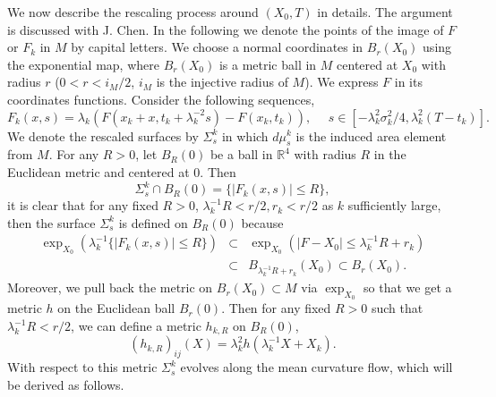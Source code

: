 We now describe the rescaling process around $(X_0,T)$ in details.
The argument is discussed with J. Chen. In the following we denote
the points of the image of $F$ or $F_k$ in $M$ by capital letters.
We choose a normal coordinates in $B_r(X_0)$ using the exponential
map, where $B_r(X_0)$ is a metric ball in $M$ centered at $X_0$
with radius $r$ ($0<r<i_M/2$, $i_M$ is the injective radius of
$M$). We express $F$ in its coordinates functions. Consider the
following sequences,
\begin{equation}\label{e0.6} F_k(x, s)=\lambda_k(F(x_k+x,
t_k+\lambda_k^{-2}s)-F(x_k, t_k)),~~~~~~ s\in
[-\lambda_k^2\sigma_k^2/4, \lambda_k^2(T-t_k)].\end{equation} We
denote the rescaled surfaces by $\Sigma^k_s$ in which $d\mu^k_s$
is the induced area element from $M$. For any $R>0$, let $B_R(0)$
be a ball in ${\mathbb{R}}^4$ with radius $R$ in the Euclidean
metric and centered at $0$. Then
$$\Sigma^k_s\cap  B_R(0)=\{|F_k(x, s)|\leq R\}, $$ it is clear
that for any fixed $R>0$, $\lambda_k^{-1}R<r/2, r_k<r/2$ as $k$
sufficiently large, then the surface $\Sigma^k_s$ is defined on
$B_R(0)$ because
\begin{eqnarray*} \exp_{X_0} (\lambda_k^{-1}\{|F_k(x, s)|\leq
R\})&\subset& \exp_{X_0} (|F-X_0|\leq \lambda_k^{-1}R+r_k)\\
&\subset& B_{\lambda_k^{-1}R+r_k}(X_0)\subset B_{r}(X_0).
\end{eqnarray*}  Moreover, we pull back the metric on $B_r(X_0)\subset
M$ via $\exp_{X_0}$ so that we get a metric $h$ on the Euclidean
ball $B_r(0)$. Then for any fixed $R>0$ such that
$\lambda_k^{-1}R<r/2$, we can define a metric $h_{k, R}$ on
$B_R(0)$,
$$( h_{k, R})_{ij}(X)=\lambda_k^{2}h(\lambda_k^{-1}X+X_k).
$$ With respect to this metric $\Sigma^k_s$ evolves along the mean
curvature flow, which will be derived as follows.

